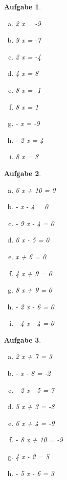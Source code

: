 \documentclass[12pt]{article}
\theoremstyle{note}
\newtheorem{aufgabe}{Aufgabe}
\begin{document}
 
    \begin{flushleft}
\begin{aufgabe} ~ \\ 
\begin{multicols}{3} 
\begin{enumerate}[a)] 
\item 
2 x = -9
\item 
9 x = -7
\item 
2 x = -4
\item 
4 x = 8
\item 
8 x = -1
\item 
8 x = 1
\item 
- x = -9
\item 
- 2 x = 4
\item 
8 x = 8
\end{enumerate} 
\end{multicols} 
\end{aufgabe} 
\begin{aufgabe} ~ \\ 
\begin{multicols}{3} 
\begin{enumerate}[a)] 
\item 
6 x + 10 = 0
\item 
- x - 4 = 0
\item 
- 9 x - 4 = 0
\item 
6 x - 5 = 0
\item 
x + 6 = 0
\item 
4 x + 9 = 0
\item 
8 x + 9 = 0
\item 
- 2 x - 6 = 0
\item 
- 4 x - 4 = 0
\end{enumerate} 
\end{multicols} 
\end{aufgabe} 
\begin{aufgabe} ~ \\ 
\begin{multicols}{3} 
\begin{enumerate}[a)] 
\item 
2 x + 7 = 3
\item 
- x - 8 = -2
\item 
- 2 x - 5 = 7
\item 
5 x + 3 = -8
\item 
6 x + 4 = -9
\item 
- 8 x + 10 = -9
\item 
4 x - 2 = 5
\item 
- 5 x - 6 = 3

\end{enumerate}
\end{multicols}
\end{aufgabe}
\end{flushleft}
\end{document}
